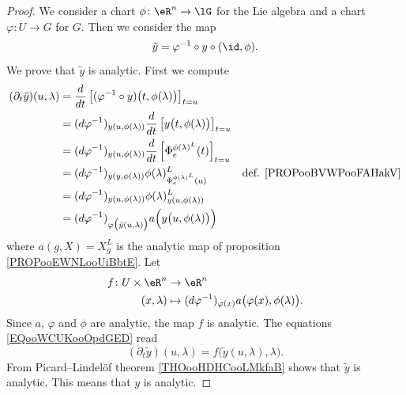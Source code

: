 \begin{proof}
	We consider a chart \(\phi \colon \eR^n\to \lG  \) for the Lie algebra and a chart \(\varphi \colon U\to G  \) for \( G\). Then we consider the map
	\begin{equation}
		\tilde y=\varphi^{-1}\circ y\circ (\id,\phi).
	\end{equation}
	We prove that \( \tilde y\) is analytic. First we compute
	\begin{subequations}		\label{EQooWCUKooOpdGED}
		\begin{align}
			(\partial_t\tilde y)(u,\lambda) & =\frac{d}{dt} \left[ (\varphi^{-1}\circ y)\big( t,\phi(\lambda) \big)  \right]_{t=u}                                                          \\
			                                & =(d\varphi^{-1})_{y (u,\phi(\lambda)) }\frac{d}{dt} \left[ y\big( t,\phi(\lambda) \big)  \right]_{t=u}                                        \\
			                                & =(d\varphi^{-1})_{y (u,\phi(\lambda) )}\frac{d}{dt} \left[ \Phi_e^{\phi(\lambda)^L}(t)  \right]_{t=u}                                         \\
			                                & =(d\varphi^{-1})_{y(y,\phi(\lambda))}\phi(\lambda)^L_{\Phi_e^{\phi(\lambda)^L}(u)}                     & \text{def. \ref{PROPooBVWPooFAHakV}} \\
			                                & =(d\varphi^{-1})_{y(u,\phi(\lambda))}\phi(\lambda)^L_{y(u,\phi(\lambda))}                                                                     \\
			                                & =(d\varphi^{-1})_{\varphi\big( \tilde y(u,\lambda) \big)}a\Big( y\big( u,\phi(\lambda) \big) \Big)
		\end{align}
	\end{subequations}
	where \( a(g,X)=X^L_g\) is the analytic map of proposition \ref{PROPooEWNLooUiBbtE}. Let
	\begin{equation}
		\begin{aligned}
			f\colon U\times \eR^n & \to \eR^n                                                                  \\
			(x,\lambda)           & \mapsto (d\varphi^{-1})_{\varphi(x)}a\big( \varphi(x),\phi(\lambda) \big).
		\end{aligned}
	\end{equation}
	Since \( a\), \( \varphi\) and \( \phi\) are analytic, the map \( f\) is analytic. The equations \eqref{EQooWCUKooOpdGED} read
	\begin{equation}
		(\partial_t\tilde y)(u,\lambda)=f\big( \tilde y(u,\lambda),\lambda \big).
	\end{equation}
	From Picard–Lindelöf theorem \ref{THOooHDHCooLMkfaB} shows that \( \tilde y\) is analytic. This means that \( y\) is analytic.
\end{proof}


